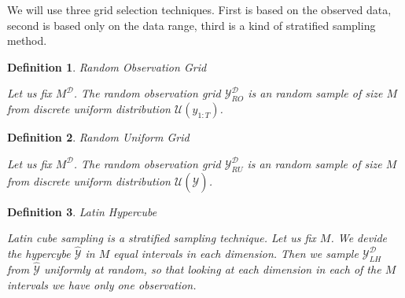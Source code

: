 \documentclass[shortabstract]{iithesis}
\newtheorem{definition}{Definition}
\begin{document}
We will use three grid selection techniques. First is based on the observed data, second is based only on the data range, third is a kind of stratified sampling method. 

\begin{definition}{Random Observation Grid}

     Let us fix $M^{\mathcal  D}$. The random observation grid $\mathcal Y^{\mathcal D}_{RO}$ is an random sample of size $M$ from discrete uniform distribution $\mathcal U (y_{1:T})$.
\end{definition}

\begin{definition}{Random Uniform Grid}

     Let us fix $M^{\mathcal  D}$. The random observation grid $\mathcal Y^{\mathcal D}_{RU}$ is an random sample of size $M$ from discrete uniform distribution $\mathcal U (\hat{\mathcal Y})$.
\end{definition}


\begin{definition} {Latin Hypercube}

    Latin cube sampling is a stratified sampling technique. Let us fix $M$. We devide the hypercybe $\hat{\mathcal Y}$ in $M$ equal intervals in each dimension. Then we sample $\mathcal Y^{\mathcal D}_{LH}$ from $\hat{\mathcal Y}$ uniformly at random, so that looking at each dimension in each of the $M$ intervals we have only one observation. 
\end{definition}




\end{document}
